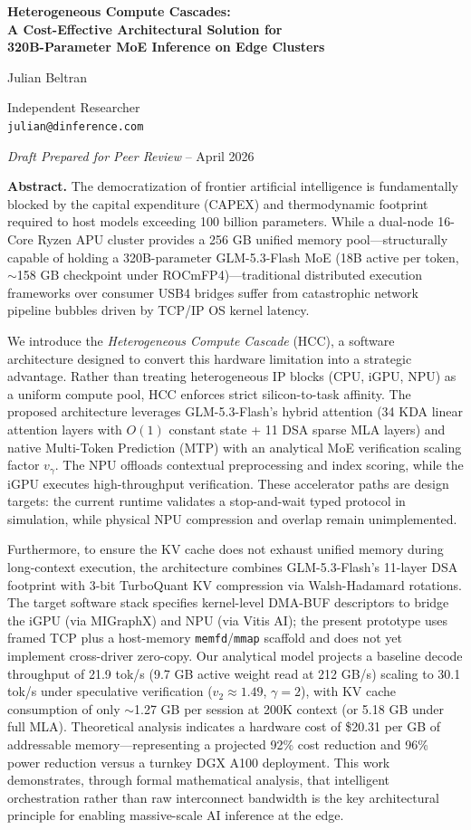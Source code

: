 \documentclass[11pt,a4paper]{article}
\makeatletter
\renewcommand{\maketitle}{
    \bgroup\setlength{\parindent}{0pt}
    \begin{center}
        \vspace*{1em}
        {\LARGE \bfseries \color{PreprintBlue} Heterogeneous Compute Cascades: \\[0.3em] A Cost-Effective Architectural Solution for \\[0.3em] 320B-Parameter MoE Inference on Edge Clusters \par}
        \vspace{1.5em}
        {\large Julian Beltran \par}
        \vspace{0.5em}
        {\color{gray} Independent Researcher \\ \texttt{julian@dinference.com} \par}
        \vspace{1em}
        {\color{gray} \textit{Draft Prepared for Peer Review} -- April 2026 \par}
    \end{center}
    \egroup
    \vspace{1em}
}
\makeatother
\begin{document}
\maketitle

\begin{center}
\begin{tcolorbox}[
    colback=AbstractBg,
    colframe=AbstractBorder,
    boxrule=0.5pt,
    arc=4pt,
    left=10pt,
    right=10pt,
    top=10pt,
    bottom=10pt
]
\textbf{Abstract.} The democratization of frontier artificial intelligence is fundamentally blocked by the capital expenditure (CAPEX) and thermodynamic footprint required to host models exceeding 100 billion parameters. While a dual-node 16-Core Ryzen APU cluster provides a 256 GB unified memory pool---structurally capable of holding a 320B-parameter GLM-5.3-Flash MoE (18B active per token, $\sim$158 GB checkpoint under ROCmFP4)---traditional distributed execution frameworks over consumer USB4 bridges suffer from catastrophic network pipeline bubbles driven by TCP/IP OS kernel latency.

We introduce the \textit{Heterogeneous Compute Cascade} (HCC), a software architecture designed to convert this hardware limitation into a strategic advantage. Rather than treating heterogeneous IP blocks (CPU, iGPU, NPU) as a uniform compute pool, HCC enforces strict silicon-to-task affinity. The proposed architecture leverages GLM-5.3-Flash's hybrid attention (34 KDA linear attention layers with $O(1)$ constant state + 11 DSA sparse MLA layers) and native Multi-Token Prediction (MTP) with an analytical MoE verification scaling factor $v_\gamma$. The NPU offloads contextual preprocessing and index scoring, while the iGPU executes high-throughput verification. These accelerator paths are design targets: the current runtime validates a stop-and-wait typed protocol in simulation, while physical NPU compression and overlap remain unimplemented.

Furthermore, to ensure the KV cache does not exhaust unified memory during long-context execution, the architecture combines GLM-5.3-Flash's 11-layer DSA footprint with 3-bit TurboQuant KV compression via Walsh-Hadamard rotations. The target software stack specifies kernel-level DMA-BUF descriptors to bridge the iGPU (via MIGraphX) and NPU (via Vitis AI); the present prototype uses framed TCP plus a host-memory \texttt{memfd}/\texttt{mmap} scaffold and does not yet implement cross-driver zero-copy. Our analytical model projects a baseline decode throughput of 21.9 tok/s (9.7 GB active weight read at 212 GB/s) scaling to 30.1 tok/s under speculative verification ($v_2 \approx 1.49$, $\gamma=2$), with KV cache consumption of only $\sim$1.27 GB per session at 200K context (or 5.18 GB under full MLA). Theoretical analysis indicates a hardware cost of \$20.31 per GB of addressable memory---representing a projected 92\% cost reduction and 96\% power reduction versus a turnkey DGX A100 deployment. This work demonstrates, through formal mathematical analysis, that intelligent orchestration rather than raw interconnect bandwidth is the key architectural principle for enabling massive-scale AI inference at the edge.
\end{tcolorbox}
\end{center}
\end{document}
